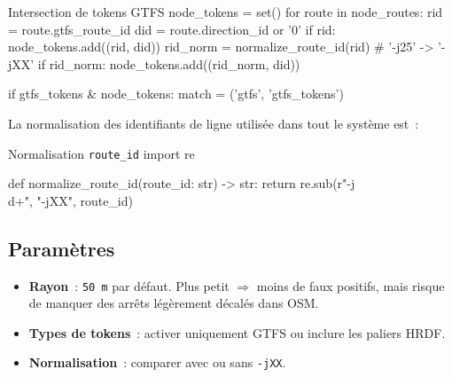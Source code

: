 \begin{codebox}[language=Python]{Intersection de tokens GTFS}
node_tokens = set()
for route in node_routes:
    rid = route.gtfs_route_id
    did = route.direction_id or '0'
    if rid:
        node_tokens.add((rid, did))
        rid_norm = normalize_route_id(rid)  # '-j25' -> '-jXX'
        if rid_norm:
            node_tokens.add((rid_norm, did))

if gtfs_tokens & node_tokens:
    match = ('gtfs', 'gtfs_tokens')
\end{codebox}

La normalisation des identifiants de ligne utilisée dans tout le système est :

\begin{codebox}[language=Python]{Normalisation \texttt{route\_id}}
import re

def normalize_route_id(route_id: str) -> str:
    return re.sub(r"-j\\d+", "-jXX", route_id)
\end{codebox}

\subsection{Paramètres}
\begin{itemize}
  \item \textbf{Rayon} : \texttt{50 m} par défaut. Plus petit $\Rightarrow$ moins de faux positifs, mais risque de manquer des arrêts légèrement décalés dans OSM.
  \item \textbf{Types de tokens} : activer uniquement GTFS ou inclure les paliers HRDF.
  \item \textbf{Normalisation} : comparer avec ou sans \texttt{-jXX}.
\end{itemize}

